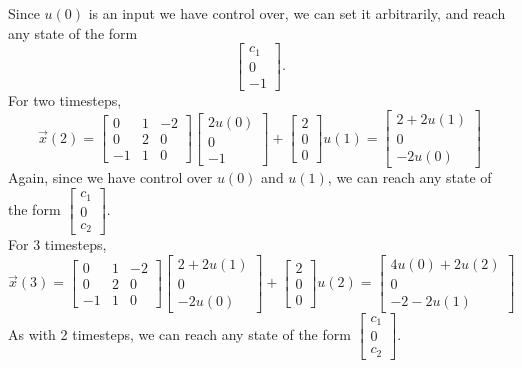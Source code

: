 \begin{enumerate}
{        Since $u(0)$ is an input we have control over, we can set it arbitrarily, and reach any state of the form 
        \[ \begin{bmatrix} c_1 \\ 0 \\ -1\end{bmatrix}. \]
        For two timesteps,
        \[\vec{x}(2) = 
        \begin{bmatrix}
            0 & 1 & -2 \\
            0 & 2 & 0 \\
            -1 & 1 & 0
        \end{bmatrix} 
        \begin{bmatrix} 
            2u(0) \\ 0 \\ -1
        \end{bmatrix}
        + \begin{bmatrix}
            2 \\ 0 \\ 0
        \end{bmatrix} u(1) = 
        \begin{bmatrix} 
            2 + 2u(1) \\ 0 \\ -2u(0)
        \end{bmatrix}\]
        Again, since we have control over $u(0)$ and $u(1)$, we can reach any state of the form $\begin{bmatrix} c_1 \\ 0 \\ c_2 \end{bmatrix}$. \\
        \newline
        For 3 timesteps,
        \[\vec{x}(3) = 
        \begin{bmatrix}
            0 & 1 & -2 \\
            0 & 2 & 0 \\
            -1 & 1 & 0
        \end{bmatrix} 
        \begin{bmatrix} 
            2 + 2u(1) \\ 0 \\ -2u(0)
        \end{bmatrix}
        + \begin{bmatrix}
            2 \\ 0 \\ 0
        \end{bmatrix} u(2) = 
        \begin{bmatrix} 
            4u(0) + 2u(2) \\ 0 \\ -2 - 2u(1)
        \end{bmatrix}\]
        As with 2 timesteps, we can reach any state of the form $\begin{bmatrix} c_1 \\ 0 \\ c_2 \end{bmatrix}$.
    }


\end{enumerate}
